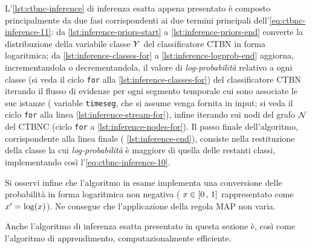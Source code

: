 L'\autoref{lst:ctbnc-inference} di inferenza esatta appena presentato è composto principalmente da due fasi corrispondenti ai due termini principali dell'\autoref{eq:ctbnc-inference-11}: da \autoref{lst:inference-priors-start} a \autoref{lst:inference-priors-end} converte la distribuzione della variabile classe $\mathnormal{Y}$ del classificatore \acs{CTBN} in forma logaritmica; da \autoref{lst:inference-classes-for} a \autoref{lst:inference-logprob-end} aggiorna, incrementandola o decrementandola, il valore di \emph{log-probabilità} relativo a ogni classe (si veda il ciclo \lstinline[]|for| alla \autoref{lst:inference-classes-for}) del classificatore \acs{CTBN} iterando il flusso di evidenze per ogni segmento temporale cui sono associate le sue istanze (\ie{} variable \lstinline[]|timeseg|, che si assume venga fornita in input; si veda il ciclo \lstinline[]|for| alla linea \autoref{lst:inference-stream-for}), infine iterando sui nodi del grafo $\mathcal{N}$ del \acs{CTBNC} (ciclo \lstinline[]|for| a \autoref{lst:inference-nodes-for}). Il passo finale dell'algoritmo, corrispondente alla linea finale (\ie{} \autoref{lst:inference-end}), consiste nella restituzione della classe la cui \emph{log-probabilità} è maggiore di quella delle restanti classi, implementando così l'\autoref{eq:ctbnc-inference-10}.

Si osservi infine che l'algoritmo in esame implementa una conversione delle probabilità in forma logaritmica non negativa (\ie{} $\mathnormal{x} \in [0\,,\,1]$ rappresentato come $\mathnormal{x}^{\prime}=\log(\mathnormal{x})$). Ne consegue che l'applicazione della regola \acs{MAP} non varia.

Anche l'algoritmo di inferenza esatta presentato in questa sezione è, così come l'algoritmo di apprendimento, computazionalmente efficiente.

